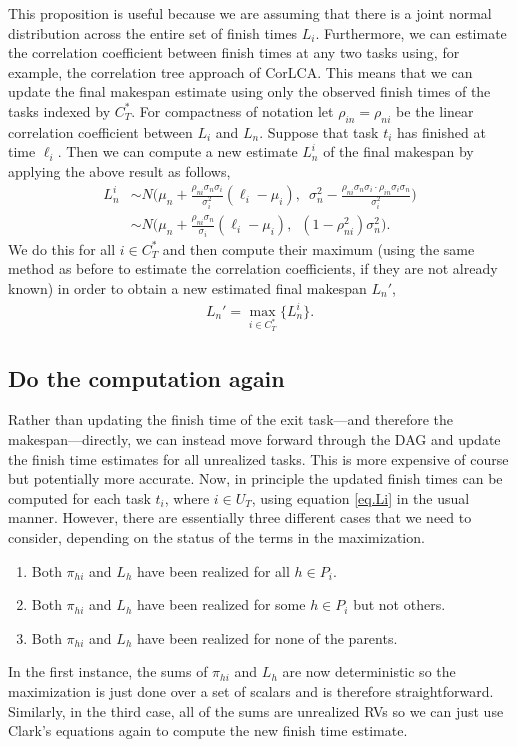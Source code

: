 \documentclass[12pt]{article}
\begin{document}
This proposition is useful because we are assuming that there is a joint normal distribution across the entire set of finish times $L_i$. Furthermore, we can estimate the correlation coefficient between finish times at any two tasks using, for example, the correlation tree approach of CorLCA. This means that we can update the final makespan estimate using only the observed finish times of the tasks indexed by $C_T^*$. For compactness of notation let $\rho_{in} = \rho_{ni}$ be the linear correlation coefficient between $L_i$ and $L_n$. Suppose that task $t_i$ has finished at time $\ell_i$. Then we can compute a new estimate $L_n^i$ of the final makespan by applying the above result as follows,
\begin{align*}
L_n^i &\sim N \bigg( \mu_{n} + \frac{\rho_{ni} \sigma_{n} \sigma_{i}}{\sigma_{i}^2} (\ell_i - \mu_{i}), \enspace \sigma_{n}^2 - \frac{\rho_{ni} \sigma_{n} \sigma_{i} \cdot \rho_{in} \sigma_{i} \sigma_{n}}{\sigma_{i}^2} \bigg) \nonumber\\
&\sim N \bigg(\mu_{n} + \frac{\rho_{ni} \sigma_{n}}{\sigma_{i}} (\ell_i - \mu_{i}), \enspace (1 - \rho_{ni}^2) \sigma_{n}^2 \bigg).
\end{align*}
We do this for all $i \in C_T^*$ and then compute their maximum (using the same method as before to estimate the correlation coefficients, if they are not already known) in order to obtain a new estimated final makespan $L_n'$, 
\begin{align*}
  L_n' = \max_{i \in C_T^*} \{ L_n^i  \}.
  \end{align*}

\subsection{Do the computation again}
\label{subsect.propagating}

Rather than updating the finish time of the exit task---and therefore the makespan---directly, we can instead move forward through the DAG and update the finish time estimates for all unrealized tasks. This is more expensive of course but potentially more accurate. Now, in principle the updated finish times can be computed for each task $t_i$, where $i \in U_T$, using equation \eqref{eq.Li} in the usual manner. However, there are essentially three different cases that we need to consider, depending on the status of the terms in the maximization.
\begin{enumerate}
\item Both $\pi_{hi}$ and $L_h$ have been realized for all $h \in P_i$.
\item Both $\pi_{hi}$ and $L_h$ have been realized for some $h \in P_i$ but not others. 
  \item Both $\pi_{hi}$ and $L_h$ have been realized for none of the parents.
  \end{enumerate}
  In the first instance, the sums of $\pi_{hi}$ and $L_h$ are now deterministic so the maximization is just done over a set of scalars and is therefore straightforward. Similarly, in the third case, all of the sums are unrealized RVs so we can just use Clark's equations again to compute the new finish time estimate.
\end{document}
